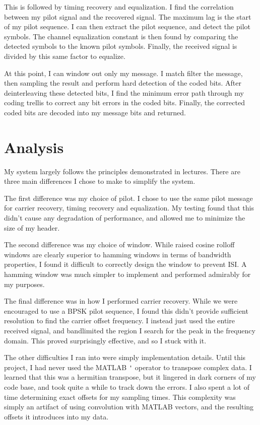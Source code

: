 \documentclass[11pt]{scrartcl}
\begin{document}
This is followed by timing recovery and equalization. I find the correlation
between my pilot signal and the recovered signal. The maximum lag is the start
of my pilot sequence. I can then extract the pilot sequence, and detect the
pilot symbols. The channel equalization constant is then found by comparing
the detected symbols to the known pilot symbols. Finally, the received signal
is divided by this same factor to equalize.

At this point, I can window out only my message. I match filter the message,
then sampling the result and perform hard detection of the coded bits. After
deinterleaving these detected bits, I find the minimum error path through my
coding trellis to correct any bit errors in the coded bits. Finally, the
corrected coded bits are decoded into my message bits and returned.




\section*{Analysis}

My system largely follows the principles demonstrated in lectures. There
are three main differences I chose to make to simplify the system.

The first difference was my choice of pilot. I chose to use the same pilot
message for carrier recovery, timing recovery and equalization. My testing
found that this didn't cause any degradation of performance, and allowed me
to minimize the size of my header.

The second difference was my choice of window. While raised cosine rolloff
windows are clearly superior to hamming windows in terms of bandwidth properties,
I found it difficult to correctly design the window to prevent ISI. A hamming
window was much simpler to implement and performed admirably for my purposes.

The final difference was in how I performed carrier recovery. While we were
encouraged to use a BPSK pilot sequence, I found this didn't provide sufficient
resolution to find the carrier offset frequency. I instead just used the entire
received signal, and bandlimited the region I search for the peak in the
frequency domain. This proved surprisingly effective, and so I stuck with it.

The other difficulties I ran into were simply implementation details. Until this
project, I had never used the MATLAB \verb|'| operator to transpose complex data.
I learned that this was a hermitian transpose, but it lingered in dark corners of
my code base, and took quite a while to track down the errors. I also spent a lot
of time determining exact offsets for my sampling times. This complexity was 
simply an artifact of using convolution with MATLAB vectors, and the resulting
offsets it introduces into my data.
\end{document}
